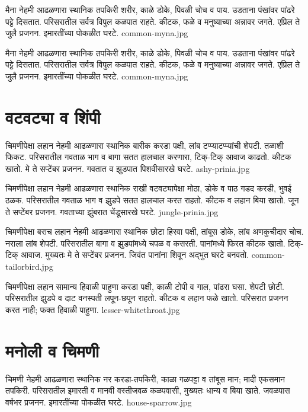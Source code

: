 \documentclass[aspectratio=169]{beamer}
\begin{document}
{मैना}
{नेहमी आढळणारा स्थानिक}
{तपकिरी शरीर, काळे डोके, पिवळी चोच व पाय. उडताना पंखांवर पांढरे पट्टे दिसतात.}
{परिसरातील सर्वत्र विपुल}
{कळपात राहते. कीटक, फळे व मनुष्याच्या अन्नावर जगते.}
{एप्रिल ते जुलै प्रजनन. इमारतींच्या पोकळीत घरटे.}
{common-myna.jpg}

{मैना}
{नेहमी आढळणारा स्थानिक}
{तपकिरी शरीर, काळे डोके, पिवळी चोच व पाय. उडताना पंखांवर पांढरे पट्टे दिसतात.}
{परिसरातील सर्वत्र विपुल}
{कळपात राहते. कीटक, फळे व मनुष्याच्या अन्नावर जगते.}
{एप्रिल ते जुलै प्रजनन. इमारतींच्या पोकळीत घरटे.}
{common-myna.jpg}

\section{वटवट्या व शिंपी}
{चिमणीपेक्षा लहान}
{नेहमी आढळणारा स्थानिक}
{बारीक करडा पक्षी, लांब टप्प्याटप्प्यांची शेपटी. तळाशी फिकट.}
{परिसरातील गवताळ भाग व बागा}
{सतत हालचाल करणारा, टिक्-टिक् आवाज काढतो. कीटक खातो.}
{मे ते सप्टेंबर प्रजनन. गवतात व झुडपात पिशवीसारखे घरटे.}
{ashy-prinia.jpg}

{चिमणीपेक्षा लहान}
{नेहमी आढळणारा स्थानिक}
{राखी वटवट्यापेक्षा मोठा, डोके व पाठ गडद करडी, भुवई ठळक.}
{परिसरातील गवताळ भाग व झुडपे}
{सतत हालचाल करत राहतो. कीटक व लहान बिया खातो.}
{जून ते सप्टेंबर प्रजनन. गवताच्या झुंबरात चेंडूसारखे घरटे.}
{jungle-prinia.jpg}

{चिमणीपेक्षा बराच लहान}
{नेहमी आढळणारा स्थानिक}
{छोटा हिरवा पक्षी, तांबूस डोके, लांब अणकुचीदार चोच. नराला लांब शेपटी.}
{परिसरातील बागा व झुडपांमध्ये}
{चपळ व कसरती. पानांमध्ये फिरत कीटक खातो. टिक्-टिक् आवाज.}
{मुख्यतः मे ते सप्टेंबर प्रजनन. जिवंत पानांना शिवून अद्भुत घरटे बनवतो.}
{common-tailorbird.jpg}

{चिमणीपेक्षा लहान}
{सामान्य हिवाळी पाहुणा}
{करडा पक्षी, काळी टोपी व गाल, पांढरा घसा. शेपटी छोटी.}
{परिसरातील झुडपे व दाट वनस्पती}
{लपून-छपून राहतो. कीटक व लहान फळे खातो.}
{परिसरात प्रजनन करत नाही; फक्त हिवाळी पाहुणा.}
{lesser-whitethroat.jpg}

\section{मनोली व चिमणी}
{चिमणी}
{नेहमी आढळणारा स्थानिक}
{नर करडा-तपकिरी, काळा गळपट्टा व तांबूस मान; मादी एकसमान तपकिरी.}
{परिसरातील इमारती व मानवी वस्तीजवळ}
{कळपवासी, मुख्यतः धान्य व बिया खाते.}
{जवळपास वर्षभर प्रजनन. इमारतींच्या पोकळीत घरटे.}
{house-sparrow.jpg}
\end{document}
